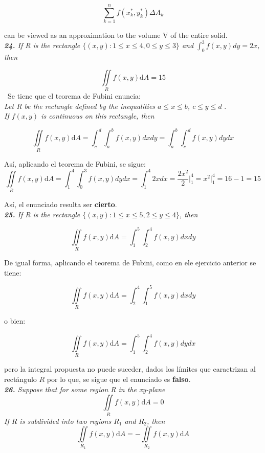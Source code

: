 \documentclass[a4paper,12pt]{article}
\begin{document}
		$$ \sum_{k=1}^{n} f(x^{*}_{k}, y^{*}_{k}) \Delta A_{k} $$

	can be viewed as an approximation to the volume V of the entire solid.\\

	\textit{\textbf{24.} If R is the rectangle $ \{(x,y):1 \leq x \leq 4,0 \leq y \leq 3\} $
			and $\int_{0}^{3} f(x,y) dy = 2x$, then}

		$$ \iint\limits_{R} f(x,y)\mathrm{d}A = 15 $$
	\
	Se tiene que el teorema de Fubini enuncia:\\
	\textit{ Let R be the rectangle defined by the inequalities $a \leq x \leq b$, $c \leq y \leq d$ }.\\
	\textit{ If $f(x, y)$ is continuous on this rectangle, then }

		$$ \iint\limits_{R} f(x,y)\mathrm{d}A = \int_{c}^{d} \int_{a}^{b} f(x,y) dx dy
			= \int_{a}^{b} \int_{c}^{d} f(x,y) dy dx  $$

	Así, aplicando el teorema de Fubini, se sigue:
		$$ \iint\limits_{R} f(x,y)\mathrm{d}A = \int_{1}^{4} \int_{0}^{3} f(x,y) dy dx
		 	= \int_{1}^{4} 2x dx = \frac{2x^2}{2} \Big|_1^4 = x^2 \Big|_1^4 = 16 - 1 = 15 $$

		Así, el enunciado resulta ser \textbf{cierto}.\\

	\textit{\textbf{25.} If R is the rectangle $ \{(x,y):1 \leq x \leq 5,2 \leq y \leq 4\} $,
			then}

		$$ \iint\limits_{R} f(x,y)\mathrm{d}A = \int_{1}^{5} \int_{2}^{4} f(x,y) dx dy $$

	De igual forma, aplicando el teorema de Fubini, como en ele ejercicio anterior se tiene:

		$$ \iint\limits_{R} f(x,y)\mathrm{d}A = \int_{2}^{4} \int_{1}^{5} f(x,y) dx dy $$

			o bien:

		$$ \iint\limits_{R} f(x,y)\mathrm{d}A = \int_{1}^{5} \int_{2}^{4} f(x,y) dy dx $$

	pero la integral propuesta no puede suceder, dados los límites que caractrizan
	al rectángulo $R$ por lo que, se sigue que el enunciado es \textbf{falso}.\\

	\textit{\textbf{26.} Suppose that for some region R in the xy-plane}
			$$ \iint\limits_{R} f(x,y)\mathrm{d}A = 0 $$
	\textit{ If $R$ is subdivided into two regions $R_1$ and $R_2$, then }
			$$ \iint\limits_{R_1} f(x,y)\mathrm{d}A = - \iint\limits_{R_2} f(x,y)\mathrm{d}A  $$
\end{document}
